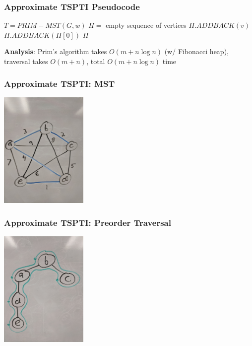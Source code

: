 \documentclass[10pt,aspectratio=169]{beamer}
\begin{document}
  \begin{frame} \frametitle{Approximate TSPTI Pseudocode}
    \begin{algorithmic}[1]
        \State $T = PRIM-MST(G, w)$
        \State $H = $ empty sequence of vertices
          \State $H.ADDBACK(v)$
        \EndFor
        \State $H.ADDBACK(H[0])$
        \State \Return $H$
      \EndFunction
    \end{algorithmic}
  \vspace{.5 cm}
  \textbf{Analysis}: Prim's algorithm takes $O(m + n \log n)$ (w/ Fibonacci heap),
  traversal takes $O(m + n)$, total $O(m + n \log n)$ time
  \end{frame}
  
  \begin{frame} \frametitle{Approximate TSPTI: MST}
    \begin{center}
      \includegraphics[height=160pt]{13-tspti-mst.jpg}
    \end{center}
  \end{frame}
  
  \begin{frame} \frametitle{Approximate TSPTI: Preorder Traversal}
    \begin{center}
      \includegraphics[height=160pt]{13-tspti-preorder.jpg}
    \end{center}
  \end{frame}
  
\end{document}
